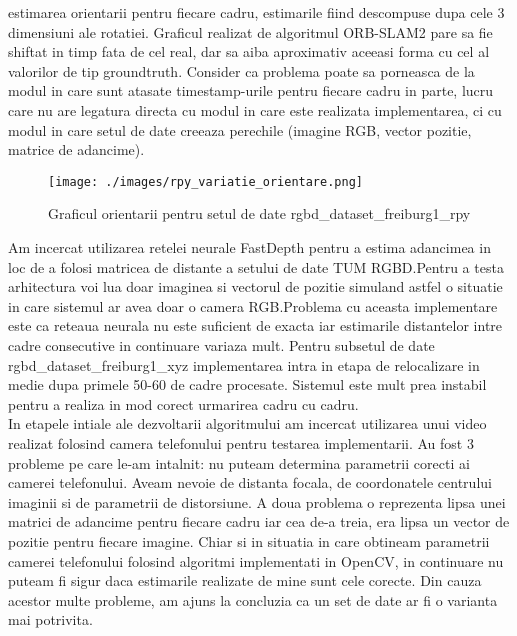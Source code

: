\documentclass[12pt,a4paper]{report}
\begin{document}
estimarea orientarii pentru fiecare cadru, estimarile fiind descompuse dupa cele 3 dimensiuni
ale rotatiei. Graficul realizat de algoritmul ORB-SLAM2 pare sa fie shiftat in timp fata 
de cel real, dar sa aiba aproximativ aceeasi forma cu cel al valorilor de tip groundtruth.
Consider ca problema poate sa porneasca de la modul in care sunt atasate timestamp-urile 
pentru fiecare cadru in parte, lucru care nu are legatura directa cu modul in care este
realizata implementarea, ci cu modul in care setul de date creeaza perechile (imagine RGB, 
vector pozitie, matrice de adancime).      
\begin{figure}[htbp] 
  \centering
  \texttt{[image: ./images/rpy\_variatie\_orientare.png]}
  \caption{Graficul orientarii pentru setul de date rgbd\_dataset\_freiburg1\_rpy}
  \label{fig:exemplu_imagine}
\end{figure}
Am incercat utilizarea retelei neurale FastDepth pentru a estima adancimea in loc de a
folosi matricea de distante a setului de date TUM RGBD.\@ Pentru a testa arhitectura voi
lua doar imaginea si vectorul de pozitie simuland astfel o situatie in care sistemul ar avea
doar o camera RGB.\@ Problema cu aceasta implementare este ca reteaua neurala nu este suficient
de exacta iar estimarile distantelor intre cadre consecutive in continuare variaza mult. Pentru 
subsetul de date rgbd\_dataset\_freiburg1\_xyz implementarea intra in etapa de relocalizare
in medie dupa primele 50{-}60 de cadre procesate. Sistemul este mult prea instabil pentru
a realiza in mod corect urmarirea cadru cu cadru. \\
In etapele intiale ale dezvoltarii algoritmului am incercat utilizarea unui video realizat 
folosind camera telefonului pentru testarea implementarii. Au fost 3 probleme pe care le-am 
intalnit: nu puteam determina parametrii corecti ai camerei telefonului. Aveam nevoie 
de distanta focala, de coordonatele centrului imaginii si de parametrii de distorsiune.
A doua problema o reprezenta lipsa unei matrici de adancime pentru fiecare cadru iar cea de-a
treia, era lipsa un vector de pozitie pentru fiecare imagine. Chiar 
si in situatia in care obtineam parametrii camerei telefonului folosind algoritmi implementati
in OpenCV, in continuare nu puteam fi sigur daca estimarile realizate 
de mine sunt cele corecte. Din cauza acestor multe probleme, am ajuns la concluzia ca un set 
de date ar fi o varianta mai potrivita.
\end{document}
